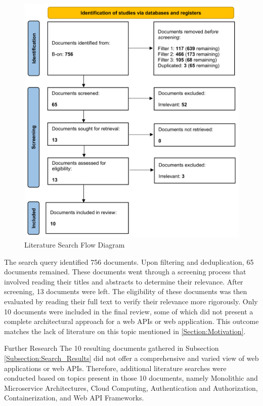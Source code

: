 \documentclass[12pt, reqno, oneside]{amsbook}
\makeatletter
\def\section{\@startsection{section}{1}%
      \z@{.5\linespacing\@plus.7\linespacing}{.25\linespacing}%
      {\normalfont\bfseries\flushleft}}
\theoremstyle{definition}
\theoremstyle{definition}
\numberwithin{section}{chapter}
\numberwithin{table}{chapter}
\numberwithin{figure}{chapter}
\makeatother
\begin{document}
\begin{figure}[H]
  \centering
  \includegraphics[width=0.9\linewidth]{images/Literature_Search_Flow_Diagram.png}
  \caption{\label{Figure:Literature_Search_Flow_Diagram}Literature Search Flow Diagram}
\end{figure}

The search query identified 756 documents. Upon filtering and deduplication, 65 documents remained. These documents went through a screening process that involved reading their titles and abstracts to determine their relevance. After screening, 13 documents were left. The eligibility of these documents was then evaluated by reading their full text to verify their relevance more rigorously. Only 10 documents were included in the final review, some of which did not present a complete architectural approach for a web \acp{API} or web application. This outcome matches the lack of literature on this topic mentioned in \ref{Section:Motivation}.

\section{Further Research}
\label{Further_Research}
The 10 resulting documents gathered in Subsection \ref{Subsection:Search_Results} did not offer a comprehensive and varied view of web applications or web \acp{API}. Therefore, additional literature searches were conducted based on topics present in those 10 documents, namely Monolithic and Microservice Architectures, Cloud Computing, Authentication and Authorization, Containerization, and Web \ac{API} Frameworks.
\end{document}
